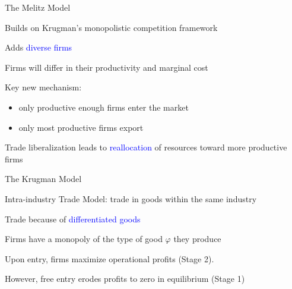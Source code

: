\documentclass[notes,11pt, aspectratio=169, xcolor=table]{beamer}
\newcommand{\blue}[1]{\textcolor{blue}{#1}}
\newenvironment{wideitemize}{\itemize\addtolength{\itemsep}{10pt}}{\enditemize}
\begin{document}
\begin{frame}{The Melitz Model}
\begin{wideitemize}
            \item Builds on Krugman’s monopolistic competition framework
            \item Adds \blue{diverse firms}
            \item Firms will differ in their productivity and marginal cost
            \item Key new mechanism:
            \begin{itemize}
                \item only productive enough firms enter the market
                \item only most productive firms export
            \end{itemize}
            \item Trade liberalization leads to \blue{reallocation} of resources toward more productive firms
\end{wideitemize}
\end{frame}

\begin{frame}{The Krugman Model}

\begin{wideitemize}
    \item Intra-industry Trade Model: trade in goods within the same industry
    \item Trade because of \blue{differentiated goods}
    \item Firms have a monopoly of the type of good $\varphi$ they produce
    \item Upon entry, firms maximize operational profits (Stage 2).
    \item  However, free entry erodes profits to zero in equilibrium (Stage 1)
\end{wideitemize}
    
\end{frame}
\end{document}

